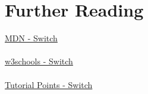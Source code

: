 \documentclass[12pt, letterpaper]{article}
\begin{document}
\section*{Further Reading}

\href{https://developer.mozilla.org/en-US/docs/Web/JavaScript/Reference/Statements/switch}{MDN - Switch}\\
\\
\href{http://www.w3schools.com/js/js_switch.asp}{w3schools - Switch}\\
\\
\href{http://www.tutorialspoint.com/javascript/javascript_switch_case.htm}{Tutorial Points - Switch}
\end{document}
